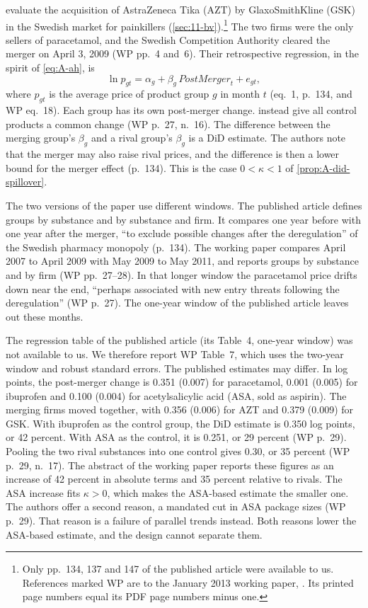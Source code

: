 \citet{BjornerstedtVerboven2016} evaluate the acquisition of AstraZeneca Tika (AZT) by GlaxoSmithKline (GSK) in the
Swedish market for painkillers (\cref{sec:11-bv}).\footnote{Only pp.~134, 137 and 147 of the published article were
available to us. References marked WP are to the January 2013 working paper, \citet{BjornerstedtVerboven2013}. Its
printed page numbers equal its PDF page numbers minus one.} The two firms were the only sellers of paracetamol, and
the Swedish Competition Authority cleared the merger on April 3, 2009 (WP pp.~4 and~6). Their retrospective
regression, in the spirit of \eqref{eq:A-ah}, is
\begin{equation*}
\ln p_{gt}=\alpha_g+\beta_g\,\mathit{PostMerger}_t+e_{gt},
\end{equation*}
where $p_{gt}$ is the average price of product group $g$ in month $t$ (eq.~1, p.~134, and WP eq.~18). Each group
has its own post-merger change. \citet{AshenfelterHosken2010} instead give all control products a common change
(WP p.~27, n.~16). The difference between the merging group's $\beta_g$ and a rival group's $\beta_g$ is a DiD
estimate. The authors note that the merger may also raise rival prices, and the difference is then a lower bound for
the merger effect (p.~134). This is the case $0<\kappa<1$ of \cref{prop:A-did-spillover}.

The two versions of the paper use different windows. The published article defines groups by substance and by
substance and firm. It compares one year before with one year after the merger, ``to exclude possible changes after
the deregulation'' of the Swedish pharmacy monopoly (p.~134). The working paper compares April 2007 to April 2009
with May 2009 to May 2011, and reports groups by substance and by firm (WP pp.~27--28). In that longer window the
paracetamol price drifts down near the end, ``perhaps associated with new entry threats following the deregulation''
(WP p.~27). The one-year window of the published article leaves out these months.

The regression table of the published article (its Table~4, one-year window) was not available to us. We therefore
report WP Table~7, which uses the two-year window and robust standard errors. The published estimates may differ. In
log points, the post-merger change is 0.351 (0.007) for paracetamol, 0.001 (0.005) for ibuprofen and 0.100 (0.004)
for acetylsalicylic acid (ASA, sold as aspirin). The merging firms moved together, with 0.356 (0.006) for AZT and
0.379 (0.009) for GSK. With ibuprofen as the control group, the DiD estimate is 0.350 log points, or 42 percent.
With ASA as the control, it is 0.251, or 29 percent (WP p.~29). Pooling the two rival substances into one control
gives 0.30, or 35 percent (WP p.~29, n.~17). The abstract of the working paper reports these figures as an increase of 42
percent in absolute terms and 35 percent relative to rivals. The ASA increase fits $\kappa>0$, which makes the
ASA-based estimate the smaller one. The authors offer a second reason, a mandated cut in ASA package sizes (WP
p.~29). That reason is a failure of parallel trends instead. Both reasons lower the ASA-based estimate, and the
design cannot separate them.

